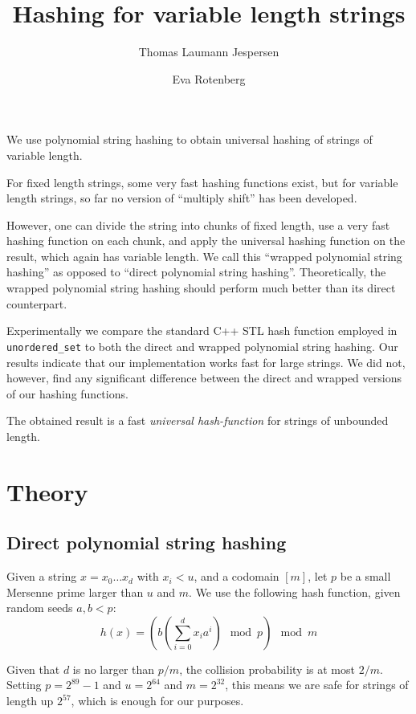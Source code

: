 \documentclass[]{article}
\title{Hashing for variable length strings}
\author{Thomas Laumann Jespersen \and Eva Rotenberg}
\newcommand{\funk}[1]{\texttt{\small #1}}
\newcommand{\cpp}{C+\!+\xspace}
\begin{document}
\maketitle

We use polynomial string hashing to obtain universal hashing of strings of variable length.

For fixed length strings, some very fast hashing functions exist, but for variable length strings, so far no version of ``multiply shift'' has been developed. 

However, one can divide the string into chunks of fixed length, use a very fast hashing function on each chunk, and apply the universal hashing function on the result, which again has variable length. We call this ``wrapped polynomial string hashing'' as opposed to ``direct polynomial string hashing''. Theoretically, the wrapped polynomial string hashing should perform much better than its direct counterpart. 

Experimentally we compare the standard \cpp STL hash function employed in \funk{unordered\_set} to both the direct and wrapped polynomial string hashing. Our results indicate that our implementation works fast for large strings. We did not, however, find any significant difference between the direct and wrapped versions of our hashing functions.


The obtained result is a fast \emph{universal hash-function} for strings of unbounded length. %

\section{Theory}

\subsection*{Direct polynomial string hashing}

Given a string $x=x_0 \ldots x_d$ with $x_i < u$, and a codomain $[m]$, let $p$ be a small Mersenne prime larger than $u$ and $m$. We use the following hash function, given random seeds $a,b < p$:
\[h(x)= \left( b \left( \sum_{i=0}^{d}x_i a^i \right) \mod p \right) \mod m \]

Given that $d$ is no larger than $p/m$, the collision probability is at most $2/m$. Setting $p=2^{89}-1$ and $u=2^{64}$ and $m=2^{32}$, this means we are safe for strings of length up $2^{57}$, which is enough for our purposes.
\end{document}
